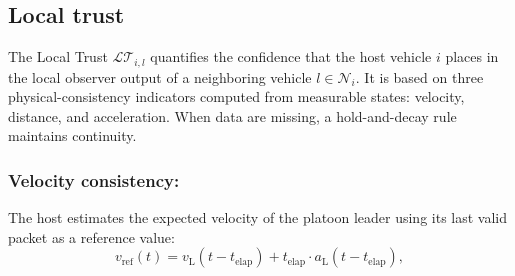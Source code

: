 \documentclass{ifacconf}
\def\N{\mathcal{N}} %
\def\LT{\mathcal{LT}} %
\begin{document}
\vspace*{-0.3cm}
\subsection{Local trust}\label{sub:local_trust}
\vspace*{-0.3cm}

The Local Trust $\LT_{i,l}$ quantifies the confidence that the host vehicle $i$ places in the local observer output of a neighboring vehicle $l \in \mathcal N_i$. 
It is based on three physical-consistency indicators computed from measurable states: velocity, distance, and acceleration. When data are missing, a hold-and-decay rule maintains continuity.




\subsubsection{Velocity consistency:}
The host estimates the expected velocity of the platoon leader using its last valid packet as a reference value:
\begin{equation}
    v_{\text{ref}}(t) = {v}_{\text{L}}(t-t_{\text{elap}}) + t_{\text{elap}} \cdot {a}_{\text{L}}(t-t_{\text{elap}}), 
\end{equation}
\end{document}
